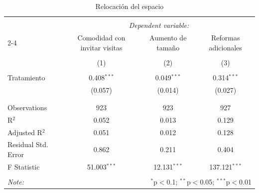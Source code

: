 
\begin{table}[H] \centering 
  \caption{Relocación del espacio} 
  \label{reg_relocation} 
\tiny 
\begin{tabular}{@{\extracolsep{-7pt}}lccc} 
\\[-1.8ex]\hline 
\hline \\[-1.8ex] 
 & \multicolumn{3}{c}{\textit{Dependent variable:}} \\ 
\cline{2-4} 
 & Comodidad con invitar visitas & Aumento de tamaño & Reformas adicionales \\ 
\\[-1.8ex] & (1) & (2) & (3)\\ 
\hline \\[-1.8ex] 
 Tratamiento & 0.408$^{***}$ & 0.049$^{***}$ & 0.314$^{***}$ \\ 
  & (0.057) & (0.014) & (0.027) \\ 
  & & & \\ 
\hline \\[-1.8ex] 
Observations & 923 & 923 & 927 \\ 
R$^{2}$ & 0.052 & 0.013 & 0.129 \\ 
Adjusted R$^{2}$ & 0.051 & 0.012 & 0.128 \\ 
Residual Std. Error & 0.862 & 0.211 & 0.404 \\ 
F Statistic & 51.003$^{***}$ & 12.131$^{***}$ & 137.121$^{***}$ \\ 
\hline 
\hline \\[-1.8ex] 
\textit{Note:}  & \multicolumn{3}{r}{$^{*}$p$<$0.1; $^{**}$p$<$0.05; $^{***}$p$<$0.01} \\ 
\end{tabular} 
\end{table} 
